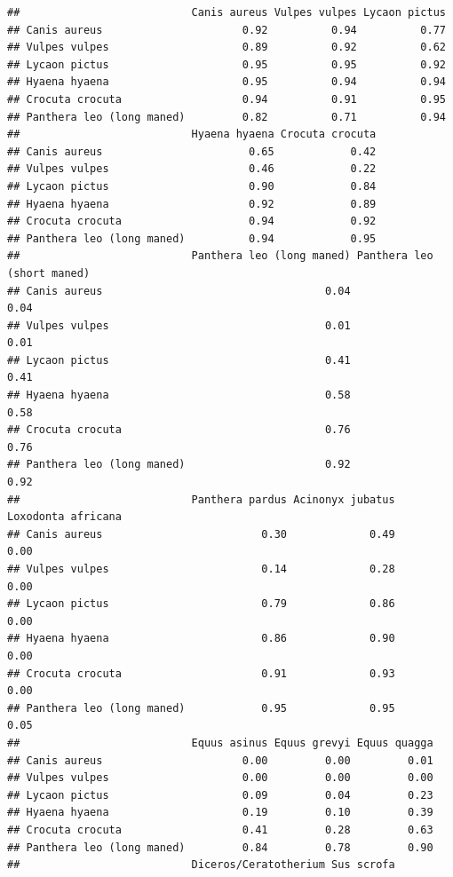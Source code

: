 \documentclass[
]{article}
\begin{document}
\begin{verbatim}
##                           Canis aureus Vulpes vulpes Lycaon pictus
## Canis aureus                      0.92          0.94          0.77
## Vulpes vulpes                     0.89          0.92          0.62
## Lycaon pictus                     0.95          0.95          0.92
## Hyaena hyaena                     0.95          0.94          0.94
## Crocuta crocuta                   0.94          0.91          0.95
## Panthera leo (long maned)         0.82          0.71          0.94
##                           Hyaena hyaena Crocuta crocuta
## Canis aureus                       0.65            0.42
## Vulpes vulpes                      0.46            0.22
## Lycaon pictus                      0.90            0.84
## Hyaena hyaena                      0.92            0.89
## Crocuta crocuta                    0.94            0.92
## Panthera leo (long maned)          0.94            0.95
##                           Panthera leo (long maned) Panthera leo (short maned)
## Canis aureus                                   0.04                       0.04
## Vulpes vulpes                                  0.01                       0.01
## Lycaon pictus                                  0.41                       0.41
## Hyaena hyaena                                  0.58                       0.58
## Crocuta crocuta                                0.76                       0.76
## Panthera leo (long maned)                      0.92                       0.92
##                           Panthera pardus Acinonyx jubatus Loxodonta africana
## Canis aureus                         0.30             0.49               0.00
## Vulpes vulpes                        0.14             0.28               0.00
## Lycaon pictus                        0.79             0.86               0.00
## Hyaena hyaena                        0.86             0.90               0.00
## Crocuta crocuta                      0.91             0.93               0.00
## Panthera leo (long maned)            0.95             0.95               0.05
##                           Equus asinus Equus grevyi Equus quagga
## Canis aureus                      0.00         0.00         0.01
## Vulpes vulpes                     0.00         0.00         0.00
## Lycaon pictus                     0.09         0.04         0.23
## Hyaena hyaena                     0.19         0.10         0.39
## Crocuta crocuta                   0.41         0.28         0.63
## Panthera leo (long maned)         0.84         0.78         0.90
##                           Diceros/Ceratotherium Sus scrofa

\end{verbatim}
\end{document}
